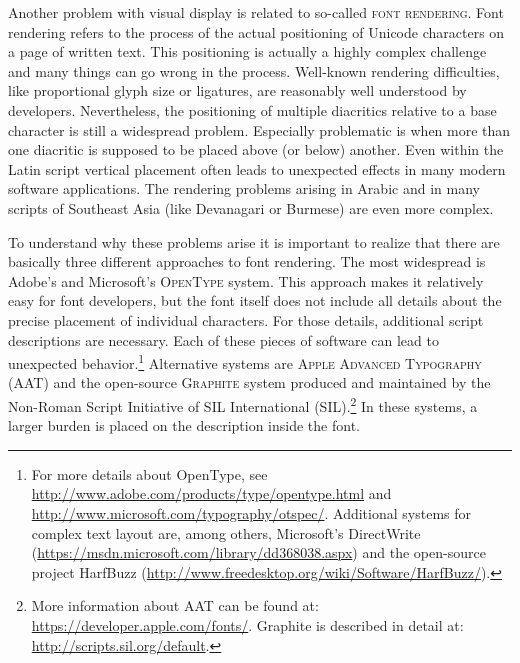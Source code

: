 
Another problem with visual display is related to so-called \textsc{font
rendering}. Font rendering refers to the process of the actual positioning of
Unicode characters on a page of written text. This positioning is actually a
highly complex challenge and many things can go wrong in the process. Well-known
rendering difficulties, like proportional glyph size or ligatures, are reasonably
well understood by developers. Nevertheless, the positioning of multiple diacritics relative to
a base character is still a widespread problem. Especially problematic is when 
more than one diacritic is supposed to be placed above (or
below) another. Even within the Latin script vertical placement 
often leads to unexpected effects in many modern software applications. 
The rendering problems arising in Arabic and in many scripts of Southeast
Asia (like Devanagari or Burmese) are even more complex. 

To understand why these problems arise it is important to realize that there are
basically three different approaches to font rendering. The most widespread is
Adobe's and Microsoft's \textsc{OpenType} system. This approach makes it
relatively easy for font developers, but the font itself does not include all
details about the precise placement of individual characters. For those details,
additional script descriptions are necessary. Each of these pieces of software can lead to
unexpected behavior.\footnote{For more details about OpenType, see
\url{http://www.adobe.com/products/type/opentype.html} and
\url{http://www.microsoft.com/typography/otspec/}. Additional systems for
complex text layout are, among others, Microsoft's DirectWrite
(\url{https://msdn.microsoft.com/library/dd368038.aspx}) and the open-source
project HarfBuzz (\url{http://www.freedesktop.org/wiki/Software/HarfBuzz/}).}
Alternative systems are \textsc{Apple Advanced Typography} (AAT) and the
open-source \textsc{Graphite} system produced and maintained by the Non-Roman Script Initiative of SIL International 
(SIL).\footnote{More information about AAT can be found at:
\url{https://developer.apple.com/fonts/}. \newline Graphite is described
in detail at:
\url{http://scripts.sil.org/default}.}
In these systems, a larger burden is placed on the description inside
the font.

